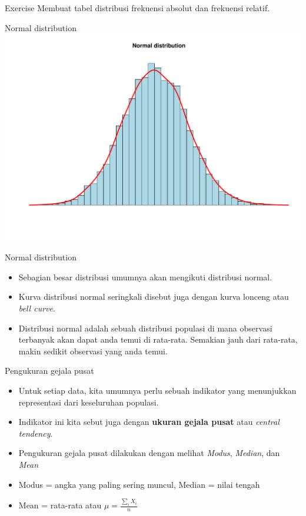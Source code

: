\documentclass[
  ignorenonframetext,
]{beamer}
\begin{document}
\begin{frame}{Exercise}
\label{exercise}
Membuat tabel distribusi frekuensi absolut dan frekuensi relatif.
\end{frame}

\begin{frame}{Normal distribution}
\label{normal-distribution}
\includegraphics{index_files/figure-beamer/unnamed-chunk-16-1.pdf}
\end{frame}

\begin{frame}{Normal distribution}
\label{normal-distribution-1}
\begin{itemize}
\item
  Sebagian besar distribusi umumnya akan mengikuti distribusi normal.
\item
  Kurva distribusi normal seringkali disebut juga dengan kurva lonceng
  atau \emph{bell curve}.
\item
  Distribusi normal adalah sebuah distribusi populasi di mana observasi
  terbanyak akan dapat anda temui di rata-rata. Semakian jauh dari
  rata-rata, makin sedikit observasi yang anda temui.
\end{itemize}
\end{frame}

\begin{frame}{Pengukuran gejala pusat}
\label{pengukuran-gejala-pusat}
\begin{itemize}
\item
  Untuk setiap data, kita umumnya perlu sebuah indikator yang
  menunjukkan representasi dari keseluruhan populasi.
\item
  Indikator ini kita sebut juga dengan \textbf{ukuran gejala pusat} atau
  \emph{central tendency}.
\item
  Pengukuran gejala pusat dilakukan dengan melihat \emph{Modus},
  \emph{Median}, dan \emph{Mean}
\item
  Modus = angka yang paling sering muncul, Median = nilai tengah
\item
  Mean = rata-rata atau \(\mu=\frac{\sum_iX_i}{n}\)
\end{itemize}
\end{frame}
\end{document}
